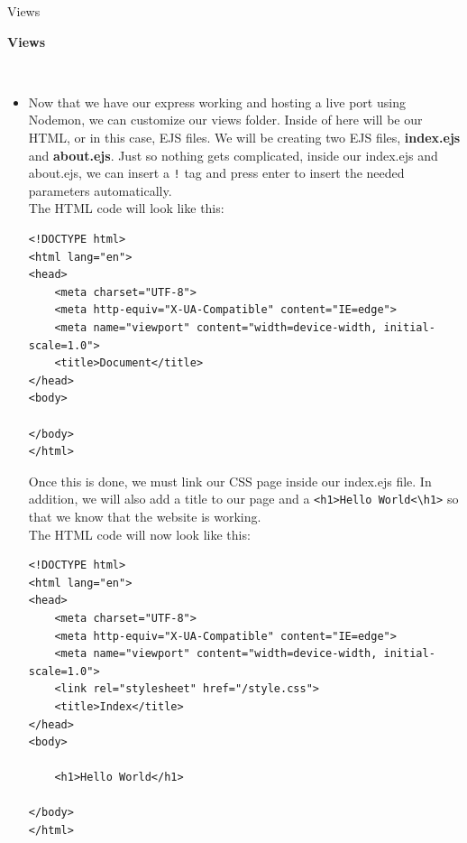 \documentclass[a4paper,12pt]{article}
\begin{document}
\begin{exe}
\ex \label{ex:tigrinya}
\glll Views\\

\begin{large} \pagebreak\textbf{Views}\end{large} \\
\begin{itemize}
\item Now that we have our express working and hosting a live port using Nodemon, we can customize our views folder. Inside of here will be our HTML, or in this case, EJS files. We will be creating two EJS files, \textbf{index.ejs} and \textbf{about.ejs}. Just so nothing gets complicated, inside our index.ejs and about.ejs, we can insert a \verb|!| tag and press enter to insert the needed parameters automatically. \\

The HTML code will look like this:
\begin{verbatim}
<!DOCTYPE html>
<html lang="en">
<head>
    <meta charset="UTF-8">
    <meta http-equiv="X-UA-Compatible" content="IE=edge">
    <meta name="viewport" content="width=device-width, initial-scale=1.0">
    <title>Document</title>
</head>
<body>
    
</body>
</html>
\end{verbatim}

Once this is done, we must link our CSS page inside our index.ejs file. In addition, we will also add a title to our page and a \verb|<h1>Hello World<\h1>| so that we know that the website is working.\\

The HTML code will now look like this:
\begin{verbatim}
<!DOCTYPE html>
<html lang="en">
<head>
    <meta charset="UTF-8">
    <meta http-equiv="X-UA-Compatible" content="IE=edge">
    <meta name="viewport" content="width=device-width, initial-scale=1.0">
    <link rel="stylesheet" href="/style.css">
    <title>Index</title>
</head>
<body>

    <h1>Hello World</h1>

</body>
</html>
\end{verbatim}


\end{itemize}
\end{exe}
\end{document}
